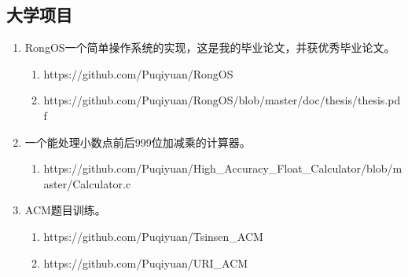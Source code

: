 \subsection{大学项目}
\begin{enumerate}
\item RongOS一个简单操作系统的实现，这是我的毕业论文，并获优秀毕业论文。
  \begin{enumerate}
  \item https://github.com/Puqiyuan/RongOS
  \item https://github.com/Puqiyuan/RongOS/blob/master/doc/thesis/thesis.pdf
  \end{enumerate}
\item 一个能处理小数点前后999位加减乘的计算器。
  \begin{enumerate}
  \item https://github.com/Puqiyuan/High\_Accuracy\_Float\_Calculator/blob/master/Calculator.c
  \end{enumerate}
\item ACM题目训练。
  \begin{enumerate}
  \item https://github.com/Puqiyuan/Tsinsen\_ACM
  \item https://github.com/Puqiyuan/URI\_ACM
  \end{enumerate}
  
\end{enumerate}
